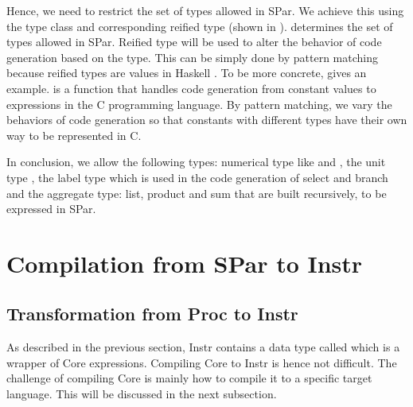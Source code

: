 Hence, we need to restrict the set of types allowed in SPar. We achieve this using the type class  and corresponding reified type  (shown in ).  determines the set of types allowed in SPar. Reified type  will be used to alter the behavior of code generation based on the type. This can be simply done by pattern matching because reified types are values in Haskell \cite{ReifiedTypeHaskellWiki}. To be more concrete,  gives an example.  is a function that handles code generation from constant values to expressions in the C programming language. By pattern matching, we vary the behaviors of code generation so that constants with different types have their own way to be represented in C.

In conclusion, we allow the following types: numerical type like  and , the unit type \hask{()}, the label type which is used in the code generation of select and branch and the aggregate type: list, product and sum that are built recursively, to be expressed in SPar.

\section{Compilation from SPar to Instr}
\subsection{Transformation from Proc to Instr}
As described in the previous section, Instr contains a data type called  which is a wrapper of Core expressions. Compiling Core to Instr is hence not difficult. The challenge of compiling Core is mainly how to compile it to a specific target language. This will be discussed in the next subsection.  

